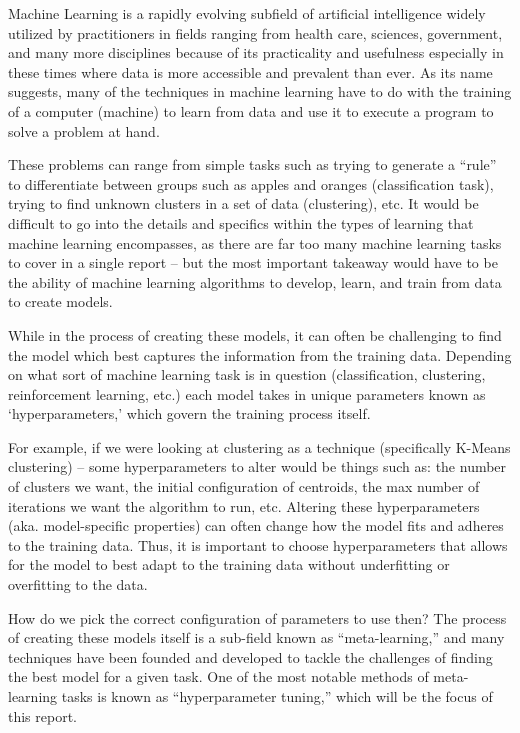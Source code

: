 \documentclass[12pt]{article}
\begin{document}
\label{sec:intro}

Machine Learning is a rapidly evolving subfield of artificial
intelligence widely utilized by practitioners in fields ranging from
health care, sciences, government, and many more disciplines because of
its practicality and usefulness especially in these times where data is
more accessible and prevalent than ever. As its name suggests, many of
the techniques in machine learning have to do with the training of a
computer (machine) to learn from data and use it to execute a program to
solve a problem at hand.

These problems can range from simple tasks such as trying to generate a
``rule'' to differentiate between groups such as apples and oranges
(classification task), trying to find unknown clusters in a set of data
(clustering), etc. It would be difficult to go into the details and
specifics within the types of learning that machine learning
encompasses, as there are far too many machine learning tasks to cover
in a single report -- but the most important takeaway would have to be
the ability of machine learning algorithms to develop, learn, and train
from data to create models.

While in the process of creating these models, it can often be
challenging to find the model which best captures the information from
the training data. Depending on what sort of machine learning task is in
question (classification, clustering, reinforcement learning, etc.) each
model takes in unique parameters known as `hyperparameters,' which
govern the training process itself.

For example, if we were looking at clustering as a technique
(specifically K-Means clustering) -- some hyperparameters to alter would
be things such as: the number of clusters we want, the initial
configuration of centroids, the max number of iterations we want the
algorithm to run, etc. Altering these hyperparameters (aka.
model-specific properties) can often change how the model fits and
adheres to the training data. Thus, it is important to choose
hyperparameters that allows for the model to best adapt to the training
data without underfitting or overfitting to the data.

How do we pick the correct configuration of parameters to use then? The
process of creating these models itself is a sub-field known as
``meta-learning,'' and many techniques have been founded and developed
to tackle the challenges of finding the best model for a given task. One
of the most notable methods of meta-learning tasks is known as
``hyperparameter tuning,'' which will be the focus of this report.
\end{document}
